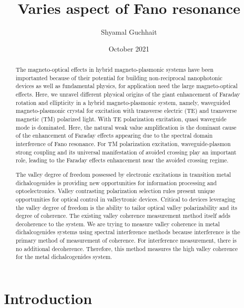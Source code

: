 \documentclass[13pt]{article}
\title{Varies aspect of Fano resonance}
\author{Shyamal Guchhait}
\date{October 2021}
\begin{document}
\maketitle

\begin{abstract}
    The magneto-optical effects in hybrid magneto-plasmonic systems have been importanted because of their potential for building non-reciprocal nanophotonic devices as well as fundamental physics, for application need the large magneto-optical effects. Here, we unravel different physical origins of the giant enhancement of Faraday rotation and ellipticity in a hybrid magneto-plasmonic system, namely, waveguided magneto-plasmonic crystal for excitation with transverse electric (TE) and transverse magnetic (TM) polarized light. With TE polarization excitation, quasi waveguide mode is dominated. Here, the natural weak value amplification is the dominant cause of the enhancement of Faraday effects appearing due to the spectral domain interference of Fano resonance. For TM polarization excitation, waveguide-plasmon strong coupling and its universal manifestation of avoided crossing play an important role, leading to the Faraday effects enhancement near the avoided crossing regime.
    \par
    The valley degree of freedom possessed by electronic excitations in transition metal dichalcogenides is providing new opportunities for information processing and optoelectronics. Valley contrasting polarization selection rules present unique opportunities for optical control in valleytronic devices. Critical to devices leveraging the valley degree of freedom is the ability to tailor optical valley polarizability and its degree of coherence. The existing valley coherence measurement method itself adds decoherence to the system. We are trying to measure valley coherence in metal dichalcogenides systems using spectral interference methods because interference is the primary method of measurement of coherence. For interference measurement, there is no additional decoherence. Therefore, this method measures the high valley coherence for the metal dichalcogenides system.
    
\end{abstract}
\section{Introduction}
\end{document}
